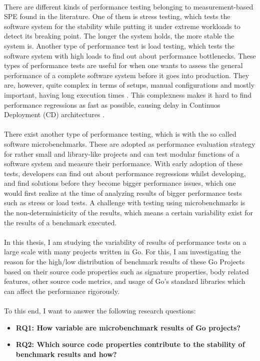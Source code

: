 \documentclass{seal_thesis}
\begin{document}
\\
There are different kinds of performance testing belonging to measurement-based SPE found in the literature. One of them is stress testing, which tests the software system for the stability while putting it under extreme workloads to detect its breaking point. The longer the system holds, the more stable the system is. Another type of performance test is load testing, which tests the software system with high loads to find out about performance bottlenecks. These types of performance tests are useful for when one wants to assess the general performance of a complete software system before it goes into production. They are, however, quite complex in terms of setups, manual configurations and mostly important, having long execution times \cite{Nguyen:2014:ICS:2597073.2597092}. This complexness makes it hard to find performance regressions as fast as possible, causing delay in Continuos Deployment (CD) architectures \cite{Laaber:2018:EOS:3196398.3196407}.\\
\\
There exist another type of performance testing, which is with the so called software microbenchmarks. These are adopted as performance evaluation strategy for rather small and library-like projects\cite{laaber2019software} and can test modular functions of a software system and measure their performance\cite{costa2019}. With early adoption of these tests, developers can find out about performance regressions whilst developing, and find solutions before they become bigger performance issues, which one would first realize at the time of analyzing results of bigger performance tests such as stress or load tests. A challenge with testing using microbenchmarks is the non-deterministicity of the results, which means a certain variability exist for the results of a benchmark executed\cite{Laaber:2018:EOS:3196398.3196407}.\\
\\
In this thesis, I am studying the variability of results of performance tests on a large scale with many projects written in Go. For this, I am investigating the reason for the high/low distribution of benchmark results of these Go Projects based on their source code properties such as signature properties, body related features, other source code metrics, and usage of Go's standard libraries which can affect the performance rigorously.\\
\\
To this end, I want to answer the following research questions: 
\begin{itemize}
	\item \textbf{RQ1: How variable are microbenchmark results of Go projects?}
	\item \textbf{RQ2: Which source code properties contribute to the stability of benchmark results and how?}
\end{itemize}
\end{document}
